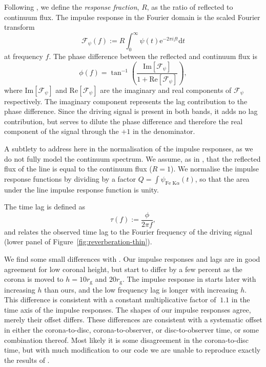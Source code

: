 \documentclass[fleqn,usenatbib]{mnras}
\newcommand{\e}{\text{e}}
\renewcommand{\d}{\text{d}}
\newcommand{\rg}{r_\text{g}}
\renewcommand{\Im}[1]{\text{Im}\left[#1\right]}
\renewcommand{\Re}[1]{\text{Re}\left[#1\right]}
\begin{document}
Following \cite{cackett_modelling_2014}, we define the \textit{response
fraction}, $R$, as the ratio of reflected to continuum flux. The impulse response
in the Fourier domain is the scaled Fourier transform
\begin{equation}
    \mathscr{F}_\psi(f) := R \int_{0}^\infty \psi(t) \e^{-2\pi i f t} \d t
\end{equation}
at frequency $f$.
The phase difference between the reflected and continuum flux is
\begin{equation}
    \phi(f) = \tan^{-1} \left(
        \frac{\Im{\mathscr{F}_\psi}}{1 + \Re{\mathscr{F}_\psi}}
    \right),
\end{equation}
where $\Im{\mathscr{F}_\psi}$ and $\Re{\mathscr{F}_\psi}$ are the imaginary and
real components of $\mathscr{F}_\psi$ respectively. The imaginary component
represents the lag contribution to the phase difference. Since the driving
signal is present in both bands, it adds no lag contribution, but serves to
dilute the phase difference and therefore the real component of the signal
through the $+1$ in the denominator.

A subtlety to address here in the normalisation of the impulse responses, as we
do not fully model the continuum spectrum. We assume, as in
\cite{cackett_modelling_2014}, that the reflected flux of the line is equal to
the continuum flux ($R = 1$). We normalise the impulse response functions by
dividing by a factor $Q = \int \psi_{\text{Fe K}\alpha}(t)$, so that the area
under the line impulse response function is unity.

The time lag is defined as
\begin{equation}
    \tau(f) := \frac{\phi}{2 \pi f},
\end{equation}
and relates the observed time lag to the Fourier frequency of the driving
signal (lower panel of Figure~\ref{fig:reverberation-thin}).

We find some small differences with \citet{cackett_modelling_2014}. Our impulse
responses and lags are in good agreement for low coronal height, but start to
differ by a few percent as the corona is moved to $h=10 \rg$ and $20 \rg$. The
impulse response in \citet{cackett_modelling_2014} starts later with increasing
$h$ than ours, and the low frequency lag is longer with increasing $h$. This
difference is consistent with a constant multiplicative factor of $~ 1.1$ in the
time axis of the impulse responses. The shapes of our impulse responses agree,
merely their offset differs. These differences are consistent with a systematic
offset in either the corona-to-disc, corona-to-observer, or disc-to-observer
time, or some combination thereof. Most likely it is some disagreement in the
corona-to-disc time, but with much modification to our code we are unable to
reproduce exactly the results of \citet{cackett_modelling_2014}.
\end{document}
